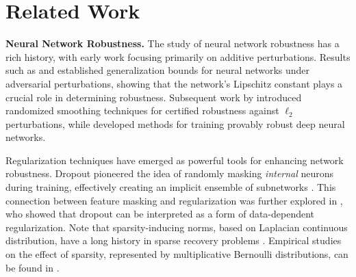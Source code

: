 \documentclass[10pt]{article} %
\theoremstyle{definition}
\theoremstyle{plain}
\begin{document}
\section{Related Work}

\textbf{Neural Network Robustness.}
The study of neural network robustness has a rich history, with early work focusing primarily on additive perturbations. Results such as \citep{bartlett2017spectrally} and \citep{miyato2018virtual} established generalization bounds for neural networks under adversarial perturbations, showing that the network's Lipschitz constant plays a crucial role in determining robustness. 
Subsequent work by \citep{cohen2019certified} introduced randomized smoothing techniques for certified robustness against $\ell_2$ perturbations, while \citep{wong2018scaling} developed methods for training provably robust deep neural networks.

Regularization techniques have emerged as powerful tools for enhancing network robustness. 
Dropout \citep{srivastava2014dropout} pioneered the idea of randomly masking \textit{internal} neurons during training, effectively creating an implicit ensemble of subnetworks \citep{yuan2022distributed, hu2023federated, kariotakis2024leveraging, wolfe2023gist, liao2022convergence, dun2023efficient, dun2022resist}. 
This connection between feature masking and regularization was further explored in \citep{ghorbani2021linearized}, who showed that dropout can be interpreted as a form of data-dependent regularization. 
Note that sparsity-inducing norms, based on Laplacian continuous distribution, have a long history in sparse recovery problems \citep{bach20112, jenatton2011structured, bach2012optimization, kyrillidis2015structured}.
Empirical studies on the effect of sparsity, represented by multiplicative Bernoulli distributions, can be found in \citep{kariotakis2024leveraging}.
\end{document}
